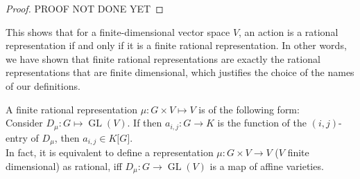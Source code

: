 \begin{proof}
  PROOF NOT DONE YET
  
\end{proof}



\begin{remark}
  This shows that for a finite-dimensional vector space $V$, an action is a rational representation if and only if it is a finite rational representation.
  In other words, we have shown that finite rational representations are exactly the rational representations that are finite dimensional, which justifies the choice of the names of our definitions.
\end{remark}

\begin{remark}
  A finite rational representation $\mu \colon G \times V \longmapsto V$ is of the following form:\\
  Consider $D_{\mu} \colon G \longmapsto \operatorname{GL}(V)$.
  If then $ a_{i,j} : G \longrightarrow K $ is the function of the $\left( i,j \right) $-entry of $D_{\mu}$, then $ a_{i,j} \in K\lbrack G\rbrack $.\\
  In fact, it is equivalent to define a representation $\mu \colon G \times V \longrightarrow V$ ($V$ finite dimensional) as rational, iff $D_{\mu} \colon G \longrightarrow \operatorname{GL}(V)$ is a map of affine varieties.
\end{remark}

